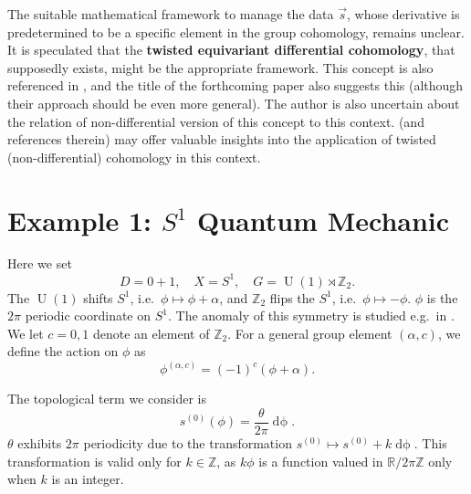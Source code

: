 \documentclass[11pt,toc=bibliography]{scrbook}
\DeclareMathOperator{\U}{U}
\numberwithin{equation}{section}
\DeclareMathOperator{\U}{U}
\begin{document}
\begin{tcolorbox}[enhanced jigsaw, opacityback=0, opacitybacktitle=0.6, leftrule=.75mm, arc=.35mm, coltitle=black, breakable, colframe=quarto-callout-note-color-frame, titlerule=0mm, colback=white, bottomrule=.15mm, left=2mm, colbacktitle=quarto-callout-note-color!10!white, toptitle=1mm, bottomtitle=1mm, title=\textcolor{quarto-callout-note-color}{\faInfo}\hspace{0.5em}{Twisted Equivariant Cohomology?}, rightrule=.15mm, toprule=.15mm]

The suitable mathematical framework to manage the data \(\vec{s}\),
whose derivative is predetermined to be a specific element in the group
cohomology, remains unclear. It is speculated that the \textbf{twisted
equivariant differential cohomology}, that supposedly exists, might be
the appropriate framework. This concept is also referenced in
\autocite{SatiSlides}, and the title of the forthcoming paper
\autocite{SatiSchreiberTED} also suggests this (although their approach
should be even more general). The author is also uncertain about the
relation of non-differential version of this concept to this context.
\autocite{Rosenberg:2024dmx} (and references therein) may offer valuable
insights into the application of twisted (non-differential) cohomology
in this context.

\end{tcolorbox}

\section{\texorpdfstring{Example 1: \(S^1\) Quantum
Mechanic}{Example 1: S\^{}1 Quantum Mechanic}}\label{sec-equivariant-example-QM}

Here we set \[
D=0+1, \quad X = S^1, \quad G = \U(1)\rtimes \mathbb{Z}_2.
\] The \(\U(1)\) shifts \(S^1\), i.e.~\(\phi\mapsto \phi+\alpha\), and
\(\mathbb{Z}_2\) flips the \(S^1\), i.e.~\(\phi\mapsto -\phi\). \(\phi\)
is the \(2\pi\) periodic coordinate on \(S^1\). The anomaly of this
symmetry is studied e.g.~in \autocite[Appendix D.1]{Gaiotto:2017yup}. We
let \(c=0,1\) denote an element of \(\mathbb{Z}_2\). For a general group
element \((\alpha,c)\), we define the action on \(\phi\) as \[
 \phi^{(\alpha,c)} = (-1)^c(\phi+\alpha).
 \]

The topological term we consider is \[
s^{(0)}(\phi) = \frac{\theta}{2\pi} \mathop{d\phi}.
\] \(\theta\) exhibits \(2\pi\) periodicity due to the transformation
\(s^{(0)} \mapsto s^{(0)} + k\mathop{d\phi}\). This transformation is
valid only for \(k\in \mathbb{Z}\), as \(k \phi\) is a function valued
in \(\mathbb{R}/2\pi\mathbb{Z}\) only when \(k\) is an integer.
\end{document}
